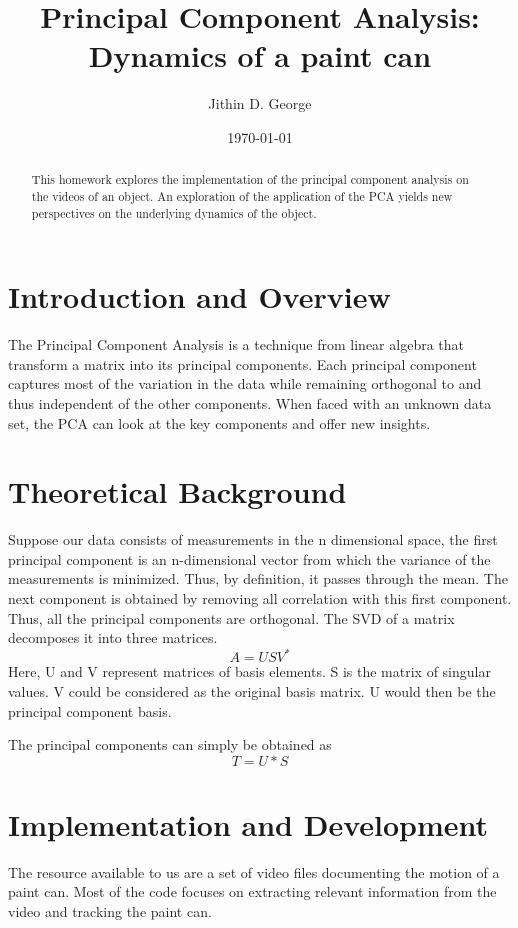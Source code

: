 \documentclass[a4paper]{article}
\title{Principal Component Analysis: Dynamics of a paint can}
\author{Jithin D. George}
\date{\today}
\begin{document}
\maketitle

\begin{abstract}
This homework explores the implementation of the principal component analysis on the videos of an object. An exploration of the application of the PCA yields new perspectives on the underlying dynamics of the object.
\end{abstract}

\section{Introduction and Overview}
\label{sec:introduction}

The Principal Component Analysis is a technique from linear algebra that transform a matrix into its principal components. Each principal component captures most of the variation in the data while remaining orthogonal to and thus independent of the other components. When faced with an unknown data set, the PCA can look at the key components and offer new insights.
 
\section{Theoretical Background}
\label{sec:theory}

Suppose our data consists of measurements in the n dimensional space, the first principal component is an n-dimensional vector from which the variance of the measurements is minimized. Thus, by definition, it passes through the mean. The next component is obtained by removing all correlation with this first component. Thus, all the principal components are orthogonal.   
The SVD of a matrix decomposes it into three matrices.
\[A=USV^{*} \]
Here, U and V represent matrices of basis elements. S is the matrix of singular values. V could be considered as the original basis matrix. U would then be the principal component basis. 

The principal components can simply be obtained as 
\[T=U*S\]


\section{Implementation and Development}
The resource available to us are a set of video files documenting the motion of a paint can. Most of the code focuses on extracting relevant information from the video and tracking the paint can.
\end{document}

